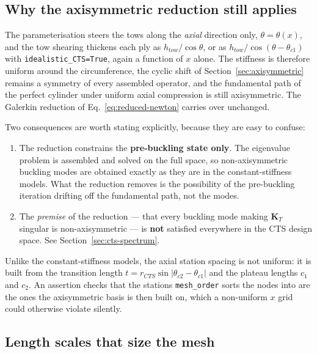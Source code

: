 \documentclass[11pt,a4paper]{article}
\begin{document}
\subsection{Why the axisymmetric reduction still applies}
\label{sec:cts-axi}

The parameterisation steers the tows along the \emph{axial} direction only,
$\theta = \theta(x)$, and the tow shearing thickens each ply as
$h_{tow}/\cos\theta$, or as $h_{tow}/\cos(\theta - \theta_{c1})$ with
\texttt{idealistic\_CTS=True}, again a function of $x$ alone.  The stiffness is
therefore uniform around the circumference, the cyclic shift of
Section~\ref{sec:axisymmetric} remains a symmetry of every assembled operator,
and the fundamental path of the perfect cylinder under uniform axial
compression is still axisymmetric.  The Galerkin reduction of
Eq.~\ref{eq:reduced-newton} carries over unchanged.

Two consequences are worth stating explicitly, because they are easy to
confuse:

\begin{enumerate}\itemsep3pt
  \item The reduction constrains the \textbf{pre-buckling state only}.  The
        eigenvalue problem is assembled and solved on the full space, so
        non-axisymmetric buckling modes are obtained exactly as they are in
        the constant-stiffness models.  What the reduction removes is the
        possibility of the pre-buckling iteration drifting off the
        fundamental path, not the modes.
  \item The \emph{premise} of the reduction --- that every buckling mode
        making $\boldsymbol{K}_T$ singular is non-axisymmetric --- is
        \textbf{not} satisfied everywhere in the CTS design space.  See
        Section~\ref{sec:cts-spectrum}.
\end{enumerate}

Unlike the constant-stiffness models, the axial station spacing is not
uniform: it is built from the transition length $t = r_{CTS}\sin|\theta_{c2} -
\theta_{c1}|$ and the plateau lengths $c_1$ and $c_2$.  An assertion checks
that the stations \texttt{mesh\_order} sorts the nodes into are the ones the
axisymmetric basis is then built on, which a non-uniform $x$ grid could
otherwise violate silently.

\subsection{Length scales that size the mesh}
\label{sec:cts-scales}
\end{document}
